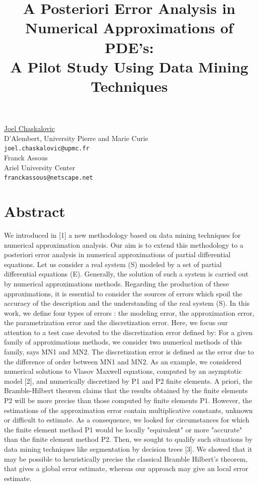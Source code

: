 \documentclass[article, A4, 11pt]{llncs}%
\begin{document}
\title{A Posteriori Error Analysis in Numerical Approximations of PDE's: \\A Pilot Study Using Data Mining Techniques}
 \author{} \institute{}
\maketitle
\begin{center}
{\large \underline{Joel Chaskalovic}}\\
D'Alembert, University Pierre and Marie Curie\\
{\tt joel.chaskalovic@upmc.fr}
\\ \vspace{4mm}
{\large Franck Assous}\\
Ariel University Center\\
{\tt franckassous@netscape.net}
\end{center}

\section*{Abstract}
We introduced in [1] a new methodology based on data mining techniques for numerical approximation analysis. Our aim is to extend this methodology to a posteriori error analysis in numerical approximations of partial differential equations. Let us consider a real system (S) modeled by a set of partial differential equations (E). Generally, the solution of such a system is carried out by numerical approximations methods. Regarding the production of these approximations, it is essential to consider the sources of errors which spoil the accuracy of the description and the understanding of the real system (S). In this work, we define four types of errors : the modeling error, the approximation error, the parametrization error and the discretization error. Here, we focus our attention to a test case devoted to the discretization error defined by: For a given family of approximations methods, we consider two numerical methods of this family, says MN1 and MN2. The discretization error is defined as the error due to the difference of order between MN1 and MN2.
As an example, we considered numerical solutions to Vlasov Maxwell equations, computed by an asymptotic model [2], and numerically discretized by P1 and P2 finite elements. A priori, the Bramble-Hilbert theorem claims that the results obtained by the finite elements P2 will be more precise than those computed by finite elements P1. However, the estimations of the approximation error contain multiplicative constants, unknown or difficult to estimate. As a consequence, we looked for circumstances for which the finite element method P1 would be locally "equivalent" or more "accurate" than the finite element method P2. Then, we sought to qualify such situations by data mining techniques like segmentation by decision trees [3]. We showed that it may  be possible to heuristically precise the classical Bramble Hilbert's theorem, that gives a global error estimate, whereas our approach may give an local error estimate.
\end{document}
